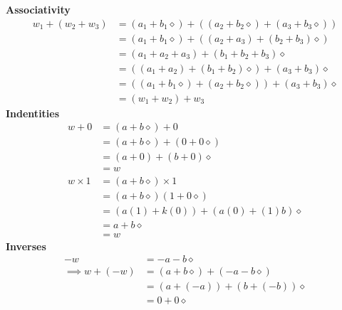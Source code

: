 \documentclass[addpoints]{exam}
\theoremstyle{mytheoremstyle}
\theoremstyle{mytheoremstyle}
\theoremstyle{myproblemstyle}
\begin{document}
\begin{questions}
\begin{parts}
\begin{solution}
            \textbf{Associativity}
            \begin{align*}
                w_{1}+(w_{2}+w_{3}) & = (a_{1}+b_{1}\diamond)+((a_{2}+b_{2}\diamond)+(a_{3}+b_{3}\diamond)) \\
                                    & = (a_{1}+b_{1}\diamond)+((a_{2}+a_{3})+(b_{2}+b_{3})\diamond)         \\
                                    & = (a_{1}+a_{2}+a_{3})+(b_{1}+b_{2}+b_{3})\diamond                     \\
                                    & = ((a_{1}+a_{2})+(b_{1}+b_{2})\diamond)+(a_{3}+b_{3})\diamond         \\
                                    & = ((a_{1}+b_{1}\diamond)+(a_{2}+b_{2}\diamond))+(a_{3}+b_{3})\diamond \\
                                    & = (w_{1}+w_{2})+w_{3}
            \end{align*}
            \textbf{Indentities}
            \begin{align*}
                w+0       & = (a+b\diamond)+0                 \\
                          & = (a+b\diamond)+(0+0\diamond)     \\
                          & = (a+0)+(b+0)\diamond             \\
                          & = w                               \\
                w\times 1 & = (a+b\diamond)\times 1           \\
                          & = (a+b\diamond)(1+0\diamond)      \\
                          & = (a(1)+k(0))+(a(0)+(1)b)\diamond \\
                          & = a+b\diamond                     \\
                          & = w
            \end{align*}
            \textbf{Inverses}
            \begin{align*}
                -w                      & = -a-b\diamond                                     \\
                \implies w+(-w)         & = (a+b\diamond)+(-a-b\diamond)                     \\
                                        & = (a+(-a))+(b+(-b))\diamond                        \\
                                        & = 0+0\diamond                                      \\

\end{align*}
\end{solution}
\end{parts}
\end{questions}
\end{document}
